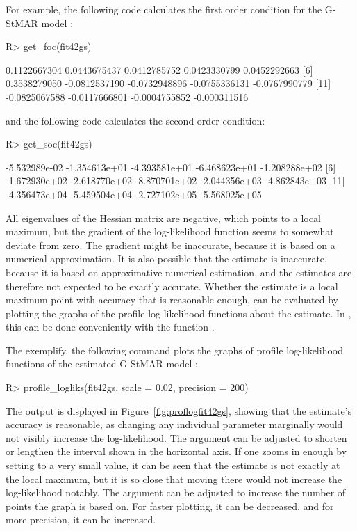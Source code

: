 \documentclass[nojss]{jss} %
\begin{document}
For example, the following code calculates the first order condition for the G-StMAR model :
%
\begin{CodeChunk}
\begin{CodeInput}
R> get_foc(fit42gs)
\end{CodeInput}
\begin{CodeOutput}
 [1]  0.1122667304  0.0443675437  0.0412785752  0.0423330799  0.0452292663
 [6]  0.3538279050 -0.0812537190 -0.0732948896 -0.0755336131 -0.0767990779
[11] -0.0825067588 -0.0117666801 -0.0004755852 -0.000311516
\end{CodeOutput}
\end{CodeChunk}
%
and the following code calculates the second order condition:
%
\begin{CodeChunk}
\begin{CodeInput}
R> get_soc(fit42gs)
\end{CodeInput}
\begin{CodeOutput}
 [1] -5.532989e-02 -1.354613e+01 -4.393581e+01 -6.468623e+01 -1.208288e+02
 [6] -1.672930e+02 -2.618770e+02 -8.870701e+02 -2.044356e+03 -4.862843e+03
[11] -4.356473e+04 -5.459504e+04 -2.727102e+05 -5.568025e+05
\end{CodeOutput}
\end{CodeChunk}
%
All eigenvalues of the Hessian matrix are negative, which points to a local maximum, but the gradient of the log-likelihood function seems to somewhat deviate from zero. The gradient might be inaccurate, because it is based on a numerical approximation. It is also possible that the estimate is inaccurate, because it is based on approximative numerical estimation, and the estimates are therefore not expected to be exactly accurate. Whether the estimate is a local maximum point with accuracy that is reasonable enough, can be evaluated by plotting the graphs of the profile log-likelihood functions about the estimate. In , this can be done conveniently with the function .

The exemplify, the following command plots the graphs of profile log-likelihood functions of the estimated G-StMAR model :
%
\begin{CodeChunk}
\begin{CodeInput}
R> profile_logliks(fit42gs, scale = 0.02, precision = 200)
\end{CodeInput}
\end{CodeChunk}
%
The output is displayed in Figure~\ref{fig:proflogfit42gs}, showing that the estimate's accuracy is reasonable, as changing any individual parameter marginally would not visibly increase the log-likelihood. The argument  can be adjusted to shorten or lengthen the interval shown in the horizontal axis. If one zooms in enough by setting  to a very small value, it can be seen that the estimate is not exactly at the local maximum, but it is so close that moving there would not increase the log-likelihood notably. The argument  can be adjusted to increase the number of points the graph is based on. For faster plotting, it can be decreased, and for more precision, it can be increased.
\end{document}

